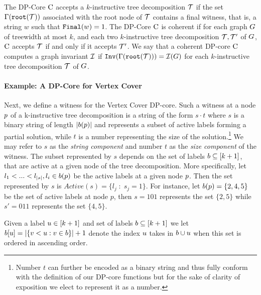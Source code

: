 The DP-Core $\mathrm{C}$ accepts a $k$-instructive tree decomposition  $\mathcal{T}$ if the set 
$\Gamma(\texttt{root}(\mathcal{T}))$ associated with the root node of $\mathcal{T}$ contains a final witness, 
that is, a string $w$ such that $\texttt{Final}(w)=1$. The DP-Core $\mathrm{C}$ is coherent if for 
each graph $G$ of treewidth at most $k$, and each two $k$-instructive tree 
decomposition $\mathcal{T},\mathcal{T}'$ of $G$, $\mathrm{C}$ accepts $\mathcal{T}$ if and only if 
it accepts $\mathcal{T}'$. We say that a coherent DP-core $\mathrm{C}$ computes a graph invariant 
$\mathcal{I}$ if $\texttt{Inv}(\Gamma(\texttt{root}(\mathcal{T}))) = \mathcal{I}(G)$ for each $k$-instructive tree decomposition $\mathcal{T}$ of $G$. 



\paragraph*{Example: A DP-Core for Vertex Cover}
\label{subsection:VC}
Next, we define a witness for the {\sc Vertex Cover} DP-core. Such a witness at a node $p$ of a k-instructive tree decomposition is a string of the form $ s\cdot t$ where $s$ is a binary string of length $|b(p)|$ and represents a subset of active labels forming a partial solution, while $t$ is a number representing the size of the solution.\footnote{Number $t$ can further be encoded as a binary string and thus fully conform with the definition of our DP-core functions but for the sake of clarity of exposition we elect to represent it as a number.} We may refer to $s$ as the \textit{string component} and number $t$ as the \textit{size component} of the witness. The subset represented by $s$ depends on the set of labels $b \subseteq [k+1]$, that are active at a given node of the tree decomposition. More specifically, let $l_1 < ... < l_{|s|}, l_i \in b(p)$ be the active labels at a given node $p$. Then the set represented by $s$ is $Active(s) = \{l_j \;:\; s_j=1\}$. For instance, let
$b(p) = \{2,4,5\}$ be the set of active labels at node $p$, then $s=101$ represents the set $\{2,5\}$ while $s'=011$ represents the set $\{4,5\}$.  

Given a label $u \in [k+1]$ and set of labels $b \subseteq [k+1]$ we let $b[u] = |\{v < u : v \in b \}|+1$ denote the index $u$ takes in $b \cup u$ when this set is ordered in ascending order. 

